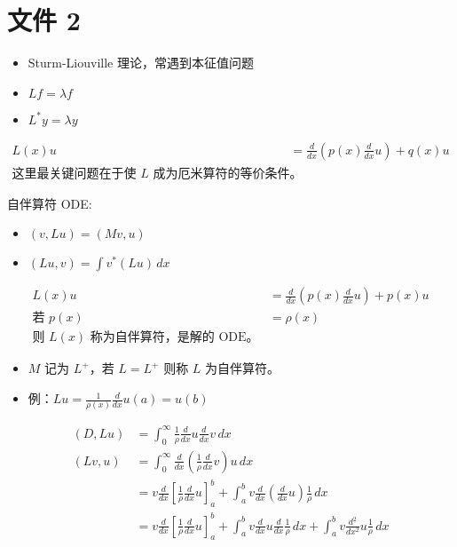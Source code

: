 \section*{文件 2}

\begin{itemize}
    \item Sturm-Liouville 理论，常遇到本征值问题
    \item $Lf = \lambda f$
    \item $L^* y = \lambda y$
\end{itemize}

\begin{align*}
L(x)u &= \frac{d}{dx} \left( p(x) \frac{d}{dx} u \right) + q(x) u \\
\text{这里最关键问题在于使 } L \text{ 成为厄米算符的等价条件。}
\end{align*}

自伴算符 ODE:
\begin{itemize}
    \item $(v, Lu) = (Mv, u)$
    \item $(Lu, v) = \int v^* (Lu) \, dx$
\end{itemize}

\begin{align*}
L(x)u &= \frac{d}{dx} \left( p(x) \frac{d}{dx} u \right) + p(x) u \\
\text{若 } p(x) &= \rho(x) \\
\text{则 } L(x) \text{ 称为自伴算符，是解的 ODE。}
\end{align*}

\begin{itemize}
    \item $M$ 记为 $L^+$，若 $L = L^+$ 则称 $L$ 为自伴算符。
    \item 例：$Lu = \frac{1}{\rho(x)} \frac{d}{dx} u(a) = u(b)$
\end{itemize}

\begin{align*}
(D, Lu) &= \int_0^\infty \frac{1}{\rho} \frac{d}{dx} u \frac{d}{dx} v \, dx \\
(Lv, u) &= \int_0^\infty \frac{d}{dx} \left( \frac{1}{\rho} \frac{d}{dx} v \right) u \, dx \\
&= v \frac{d}{dx} \left[ \frac{1}{\rho} \frac{d}{dx} u \right]_a^b + \int_a^b v \frac{d}{dx} \left( \frac{d}{dx} u \right) \frac{1}{\rho} \, dx \\
&= v \frac{d}{dx} \left[ \frac{1}{\rho} \frac{d}{dx} u \right]_a^b + \int_a^b v \frac{d}{dx} u \frac{d}{dx} \frac{1}{\rho} \, dx + \int_a^b v \frac{d^2}{dx^2} u \frac{1}{\rho} \, dx
\end{align*}

